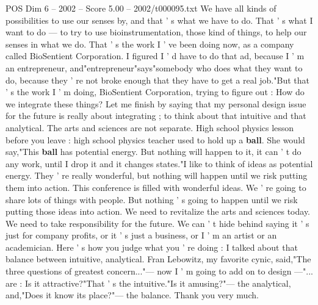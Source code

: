 \begin{textsample}{POS Dim 6 – 2002 – Score 5.00 – 2002/t000095.txt}
We have all kinds of possibilities to use our senses by, and that ' s what we have to do.
That ' s what I want to do — to try to use bioinstrumentation, those kind of things, to help our senses in what we do.
That ' s the work I ' ve been doing now, as a company called BioSentient Corporation.
I figured I ' d have to do that ad, because I ' m an entrepreneur, and"entrepreneur"says"somebody who does what they want to do, because they ' re not broke enough that they have to get a real job."But that ' s the work I ' m doing, BioSentient Corporation, trying to figure out : How do we integrate these things?
Let me finish by saying that my personal design issue for the future is really about integrating ; to think about that intuitive and that analytical.
The arts and sciences are not separate.
High school physics lesson before you leave : high school physics teacher used to hold up a \textbf{ball}.
She would say,"This \textbf{ball} has potential energy.
But nothing will happen to it, it can ' t do any work, until I drop it and it changes states."I like to think of ideas as potential energy.
They ' re really wonderful, but nothing will happen until we risk putting them into action.
This conference is filled with wonderful ideas.
We ' re going to share lots of things with people.
But nothing ' s going to happen until we risk putting those ideas into action.
We need to revitalize the arts and sciences today.
We need to take responsibility for the future.
We can ' t hide behind saying it ' s just for company profits, or it ' s just a business, or I ' m an artist or an academician.
Here ' s how you judge what you ' re doing : I talked about that balance between intuitive, analytical.
Fran Lebowitz, my favorite cynic, said,"The three questions of greatest concern..."— now I ' m going to add on to design —"... are : Is it attractive?"That ' s the intuitive."Is it amusing?"— the analytical, and,"Does it know its place?"— the balance.
Thank you very much.

\end{textsample}

